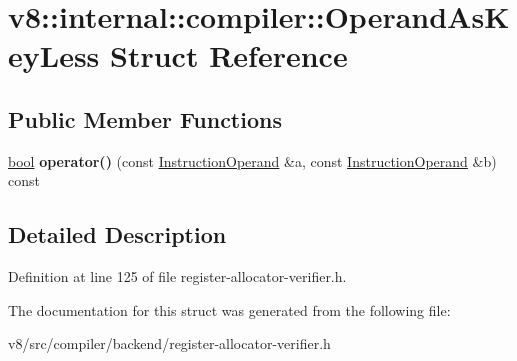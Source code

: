 \hypertarget{structv8_1_1internal_1_1compiler_1_1OperandAsKeyLess}{}\section{v8\+:\+:internal\+:\+:compiler\+:\+:Operand\+As\+Key\+Less Struct Reference}
\label{structv8_1_1internal_1_1compiler_1_1OperandAsKeyLess}
\subsection*{Public Member Functions}
\begin{DoxyCompactItemize}
\item 
\mbox{\label{structv8_1_1internal_1_1compiler_1_1OperandAsKeyLess_ae637fd89b6e1f053e6a0eb784623cdf4}} 
\mbox{\hyperlink{classbool}{bool}} {\bfseries operator()} (const \mbox{\hyperlink{classv8_1_1internal_1_1compiler_1_1InstructionOperand}{Instruction\+Operand}} \&a, const \mbox{\hyperlink{classv8_1_1internal_1_1compiler_1_1InstructionOperand}{Instruction\+Operand}} \&b) const
\end{DoxyCompactItemize}


\subsection{Detailed Description}


Definition at line 125 of file register-\/allocator-\/verifier.\+h.



The documentation for this struct was generated from the following file\+:\begin{DoxyCompactItemize}
\item 
v8/src/compiler/backend/register-\/allocator-\/verifier.\+h\end{DoxyCompactItemize}
